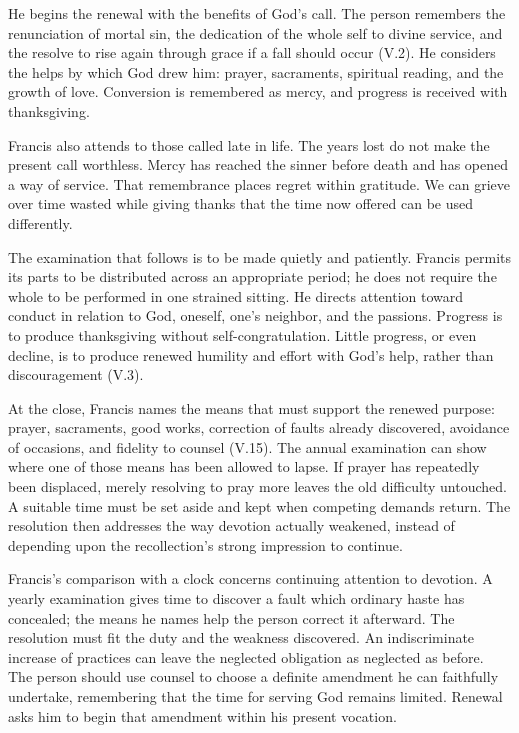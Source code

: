 He begins the renewal with the benefits of God's call. The person remembers the renunciation of mortal sin, the dedication of the whole self to divine service, and the resolve to rise again through grace if a fall should occur (V.2). He considers the helps by which God drew him: prayer, sacraments, spiritual reading, and the growth of love. Conversion is remembered as mercy, and progress is received with thanksgiving.

Francis also attends to those called late in life. The years lost do not make the present call worthless. Mercy has reached the sinner before death and has opened a way of service. That remembrance places regret within gratitude. We can grieve over time wasted while giving thanks that the time now offered can be used differently.

The examination that follows is to be made quietly and patiently. Francis permits its parts to be distributed across an appropriate period; he does not require the whole to be performed in one strained sitting. He directs attention toward conduct in relation to God, oneself, one's neighbor, and the passions. Progress is to produce thanksgiving without self-congratulation. Little progress, or even decline, is to produce renewed humility and effort with God's help, rather than discouragement (V.3).

At the close, Francis names the means that must support the renewed purpose: prayer, sacraments, good works, correction of faults already discovered, avoidance of occasions, and fidelity to counsel (V.15). The annual examination can show where one of those means has been allowed to lapse. If prayer has repeatedly been displaced, merely resolving to pray more leaves the old difficulty untouched. A suitable time must be set aside and kept when competing demands return. The resolution then addresses the way devotion actually weakened, instead of depending upon the recollection's strong impression to continue.

Francis's comparison with a clock concerns continuing attention to devotion. A yearly examination gives time to discover a fault which ordinary haste has concealed; the means he names help the person correct it afterward. The resolution must fit the duty and the weakness discovered. An indiscriminate increase of practices can leave the neglected obligation as neglected as before. The person should use counsel to choose a definite amendment he can faithfully undertake, remembering that the time for serving God remains limited. Renewal asks him to begin that amendment within his present vocation.

